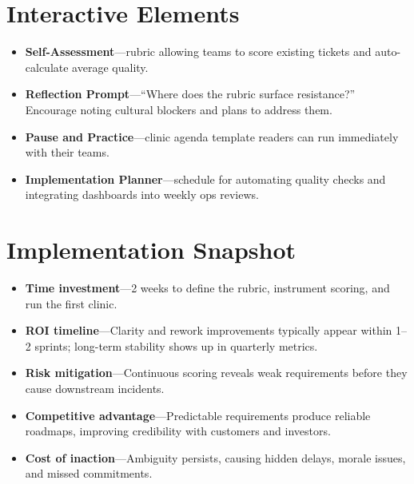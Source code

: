 \section{Interactive Elements}
\label{sec:quality-interactive}
\begin{itemize}
    \item \textbf{Self-Assessment}—rubric allowing teams to score existing tickets and auto-calculate average quality.
    \item \textbf{Reflection Prompt}—``Where does the rubric surface resistance?'' Encourage noting cultural blockers and plans to address them.
    \item \textbf{Pause and Practice}—clinic agenda template readers can run immediately with their teams.
    \item \textbf{Implementation Planner}—schedule for automating quality checks and integrating dashboards into weekly ops reviews.
\end{itemize}

\section{Implementation Snapshot}
\label{sec:quality-snapshot}
\begin{itemize}
    \item \textbf{Time investment}—2 weeks to define the rubric, instrument scoring, and run the first clinic.
    \item \textbf{ROI timeline}—Clarity and rework improvements typically appear within 1--2 sprints; long-term stability shows up in quarterly metrics.
    \item \textbf{Risk mitigation}—Continuous scoring reveals weak requirements before they cause downstream incidents.
    \item \textbf{Competitive advantage}—Predictable requirements produce reliable roadmaps, improving credibility with customers and investors.
    \item \textbf{Cost of inaction}—Ambiguity persists, causing hidden delays, morale issues, and missed commitments.
\end{itemize}
